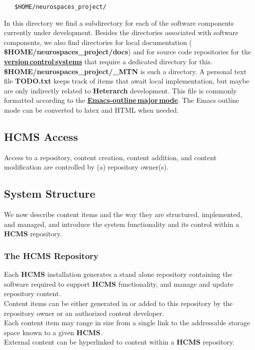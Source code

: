 \documentclass[12pt]{article}
\begin{document}
\begin{verbatim}
   $HOME/neurospaces_project/
\end{verbatim}
In this directory we find a subdirectory for each of the software components currently under development.
Besides the directories associated with software components, we also
find directories for local documentation ({\bf
  \$HOME/neurospaces\_project/docs}) and for source code repositories
for the \href{../version-control/version-control.tex}{\bf version\,control\,systems} 
that require a dedicated directory for this.  {\bf
  \$HOME/neurospaces\_project/\_MTN} is such a directory.
A personal text file {\bf TODO.txt} keeps track of items that await
local implementation, but maybe are only indirectly related to {\bf\small{Heterarch}} development.  This file is commonly formatted according to the
\href{http://www.gnu.org/software/emacs/}{\bf Emacs}\href{http://www.emacswiki.org/emacs/OutlineMode}{\bf\--outline\,major\,mode}.
The Emacs outline mode can be converted to latex and HTML when needed.

\subsection*{HCMS Access}

Access to a repository, content creation, content addition, and content modification are controlled by (a) repository owner(s).

\subsection*{System Structure}

We now describe content items and the way they are structured, implemented, and managed, and introduce the system functionality and its control within a {\bf \small HCMS} repository.

\subsubsection*{The HCMS Repository}

Each {\bf \small HCMS} installation generates a stand alone repository containing the software required to support {\bf \small HCMS} functionality, and manage and update repository content.\\
Content items can be either generated in or added to this repository by the repository owner or an authorized content developer.\\
Each content item may range in size from a single link to the addressable storage space known to a given {\bf \small HCMS}.\\
External content can be hyperlinked to content within a {\bf \small HCMS} repository.
\end{document}
